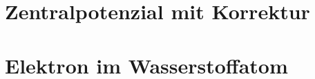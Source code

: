 
\section{Zentralpotenzial mit Korrektur} %
\label{sec:Zentralpotenzial mit Korrektur}


\section{Elektron im Wasserstoffatom} %
\label{sec:Elektron im Wasserstoffatom}



